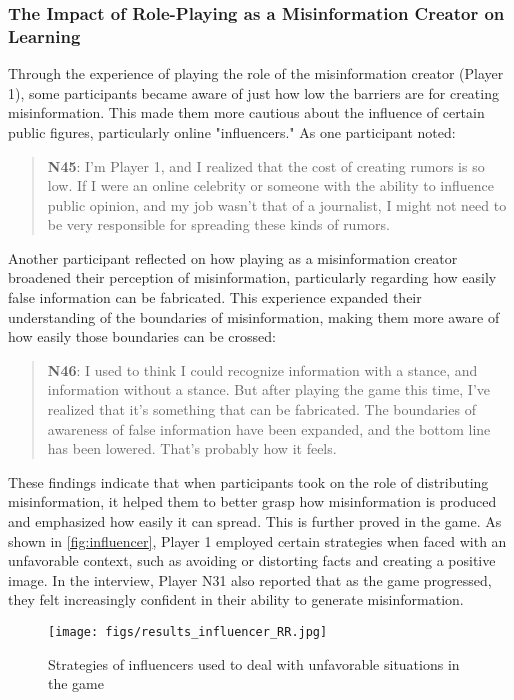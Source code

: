 \subsubsection{The Impact of Role-Playing as a Misinformation Creator on Learning}
Through the experience of playing the role of the misinformation creator (Player 1), some participants became aware of just how low the barriers are for creating misinformation. This made them more cautious about the influence of certain public figures, particularly online "influencers." As one participant noted: 
\begin{quote}
    \textbf{N45}:
    I'm Player 1, and I realized that the cost of creating rumors is so low. If I were an online celebrity or someone with the ability to influence public opinion, and my job wasn't that of a journalist, I might not need to be very responsible for spreading these kinds of rumors.
\end{quote}
Another participant reflected on how playing as a misinformation creator broadened their perception of misinformation, particularly regarding how easily false information can be fabricated. This experience expanded their understanding of the boundaries of misinformation, making them more aware of how easily those boundaries can be crossed: 
\begin{quote}
    \textbf{N46}:
    I used to think I could recognize information with a stance, and information without a stance. But after playing the game this time, I've realized that it’s something that can be fabricated. The boundaries of awareness of false information have been expanded, and the bottom line has been lowered. That's probably how it feels.
\end{quote}
These findings indicate that when participants took on the role of distributing misinformation, it helped them to better grasp how misinformation is produced and emphasized how easily it can spread. This is further proved in the game. As shown in \autoref{fig:influencer}, Player 1 employed certain strategies when faced with an unfavorable context, such as avoiding or distorting facts and creating a positive image. In the interview, Player N31 also reported that as the game progressed, they felt increasingly confident in their ability to generate misinformation.
\begin{figure}
    \centering
    \texttt{[image: figs/results\_influencer\_RR.jpg]}
    \caption{Strategies of influencers used to deal with unfavorable situations in the game}
    \label{fig:influencer}
\end{figure}
